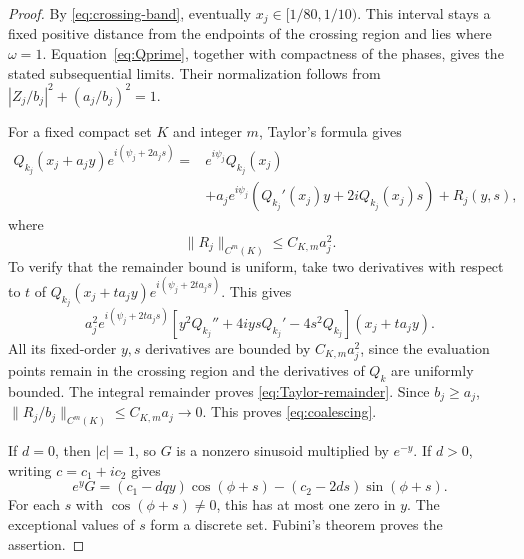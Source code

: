 \documentclass[11pt,twoside,leqno]{article}
\numberwithin{equation}{section}
\theoremstyle{definition}
\theoremstyle{remark}
\begin{document}
\begin{proof}
By \eqref{eq:crossing-band}, eventually $x_j\in[1/80,1/10)$.
This interval stays a fixed positive distance from the endpoints of
the crossing region and lies where $\omega=1$.
Equation~\eqref{eq:Qprime}, together with compactness of the phases,
gives the stated subsequential limits. Their normalization follows
from $|Z_j/b_j|^2+(a_j/b_j)^2=1$.

For a fixed compact set $K$ and integer $m$, Taylor's formula gives
\begin{align*}
 Q_{k_j}(x_j+a_jy)e^{i(\psi_j+2a_js)}
 ={}&e^{i\psi_j}Q_{k_j}(x_j)\\
 &+a_je^{i\psi_j}
   (Q_{k_j}'(x_j)y+2iQ_{k_j}(x_j)s)+R_j(y,s),
\end{align*}
where
\begin{equation}\label{eq:Taylor-remainder}
 \|R_j\|_{C^m(K)}\le C_{K,m}a_j^2.
\end{equation}
To verify that the remainder bound is uniform, take two derivatives
with respect to $t$ of
$Q_{k_j}(x_j+ta_jy)e^{i(\psi_j+2ta_js)}$. This gives
\[
 a_j^2e^{i(\psi_j+2ta_js)}
 [y^2Q_{k_j}''+4iysQ_{k_j}'-4s^2Q_{k_j}](x_j+ta_jy).
\]
All its fixed-order $y,s$ derivatives are bounded by $C_{K,m}a_j^2$,
since the evaluation points remain in the crossing region and the
derivatives of $Q_k$ are uniformly bounded. The integral remainder proves
\eqref{eq:Taylor-remainder}. Since $b_j\ge a_j$,
$\|R_j/b_j\|_{C^m(K)}\le C_{K,m}a_j\to0$.
This proves \eqref{eq:coalescing}.

If $d=0$, then $|c|=1$, so $G$ is a nonzero sinusoid multiplied by
$e^{-y}$.
If $d>0$, writing $c=c_1+ic_2$ gives
\[
 e^yG=(c_1-dqy)\cos(\phi+s)-(c_2-2ds)\sin(\phi+s).
\]
For each $s$ with $\cos(\phi+s)\ne0$, this has at most one zero in
$y$. The exceptional values of $s$ form a discrete set. Fubini's
theorem proves the assertion.
\end{proof}
\end{document}
